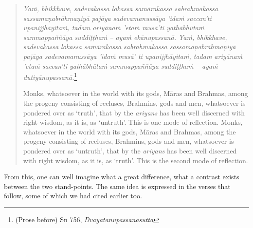 \begin{quote}
\emph{Yaṁ, bhikkhave, sadevakassa lokassa samārakassa sabrahmakassa sassamaṇabrāhmaṇiyā pajāya sadevamanussāya `idaṁ saccan'ti upanijjhāyitaṁ, tadam ariyānaṁ 'etaṁ musā'ti yathābhūtaṁ sammappaññāya suddiṭṭhaṁ -- ayaṁ ekānupassanā. Yaṁ, bhikkhave, sadevakassa lokassa samārakassa sabrahmakassa sassamaṇabrāhmaṇiyā pajāya sadevamanussāya 'idaṁ musā' ti upanijjhāyitaṁ, tadam ariyānaṁ 'etaṁ saccan'ti yathābhūtaṁ sammappaññāya suddiṭṭhaṁ -- ayaṁ dutiyānupassanā.}\footnote{(Prose before) Sn 756, \emph{Dvayatānupassanasutta}}

Monks, whatsoever in the world with its gods, Māras and Brahmas, among the progeny consisting of recluses, Brahmins, gods and men, whatsoever is pondered over as `truth', that by the \emph{ariyans} has been well discerned with right wisdom, as it is, as `untruth'. This is one mode of reflection. Monks, whatsoever in the world with its gods, Māras and Brahmas, among the progeny consisting of recluses, Brahmins, gods and men, whatsoever is pondered over as `untruth', that by the \emph{ariyans} has been well discerned with right wisdom, as it is, as `truth'. This is the second mode of reflection.
\end{quote}

From this, one can well imagine what a great difference, what a contrast exists between the two stand-points. The same idea is expressed in the verses that follow, some of which we had cited earlier too.

